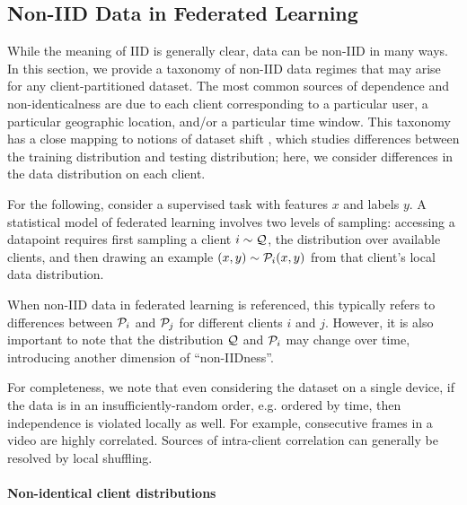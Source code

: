 \documentclass[11pt]{article}
\begin{document}
\subsection{Non-IID Data in Federated Learning}\label{sec:noniid}
While the meaning of IID is generally clear, data can be non-IID in many ways. In this section, we provide a taxonomy of non-IID data regimes that may arise for any client-partitioned dataset. The most common sources of dependence and non-identicalness are due to each client corresponding to a particular user, a particular geographic location, and/or a particular time window. This taxonomy has a close mapping to notions of dataset shift \citep{torres2012unifying,candela2009datasetshift}, which studies differences between the training distribution and testing distribution; here, we consider differences in the data distribution on each client. 

For the following, consider a supervised task with features $x$ and labels $y$. A statistical model of federated learning involves two levels of sampling: accessing a datapoint requires first sampling a client $i \sim \mathcal{Q}$, the distribution over available clients, and then drawing an example $(x, y) \sim \mathcal{P}_i(x, y)$ from that client's local data distribution. 

When non-IID data in federated learning is referenced, this typically refers to differences between $\mathcal{P}_i$ and $\mathcal{P}_j$ for different clients $i$ and $j$.  However, it is also important to note that the distribution $\mathcal{Q}$ and $\mathcal{P}_i$ may change over time, introducing another dimension of ``non-IIDness''. 

For completeness, we note that even considering the dataset on a single device, if the data is in an insufficiently-random order, e.g. ordered by time, then independence is violated locally as well.  For example, consecutive frames in a video are highly correlated. Sources of intra-client correlation can generally be resolved by local shuffling.

\paragraph{Non-identical client distributions}
\end{document}
